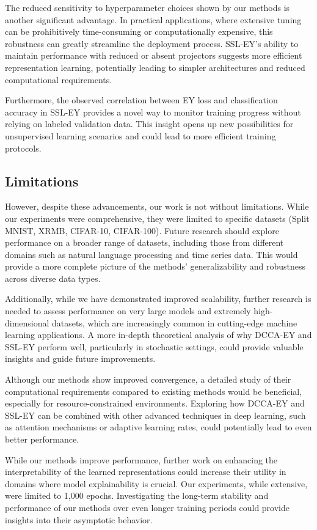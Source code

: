 The reduced sensitivity to hyperparameter choices shown by our methods is another significant advantage. In practical applications, where extensive tuning can be prohibitively time-consuming or computationally expensive, this robustness can greatly streamline the deployment process. SSL-EY's ability to maintain performance with reduced or absent projectors suggests more efficient representation learning, potentially leading to simpler architectures and reduced computational requirements.

Furthermore, the observed correlation between EY loss and classification accuracy in SSL-EY provides a novel way to monitor training progress without relying on labeled validation data. This insight opens up new possibilities for unsupervised learning scenarios and could lead to more efficient training protocols.

\subsection{Limitations}

However, despite these advancements, our work is not without limitations. While our experiments were comprehensive, they were limited to specific datasets (Split MNIST, XRMB, CIFAR-10, CIFAR-100). Future research should explore performance on a broader range of datasets, including those from different domains such as natural language processing and time series data. This would provide a more complete picture of the methods' generalizability and robustness across diverse data types.

Additionally, while we have demonstrated improved scalability, further research is needed to assess performance on very large models and extremely high-dimensional datasets, which are increasingly common in cutting-edge machine learning applications. A more in-depth theoretical analysis of why DCCA-EY and SSL-EY perform well, particularly in stochastic settings, could provide valuable insights and guide future improvements.

Although our methods show improved convergence, a detailed study of their computational requirements compared to existing methods would be beneficial, especially for resource-constrained environments. Exploring how DCCA-EY and SSL-EY can be combined with other advanced techniques in deep learning, such as attention mechanisms or adaptive learning rates, could potentially lead to even better performance.

While our methods improve performance, further work on enhancing the interpretability of the learned representations could increase their utility in domains where model explainability is crucial. Our experiments, while extensive, were limited to 1,000 epochs. Investigating the long-term stability and performance of our methods over even longer training periods could provide insights into their asymptotic behavior.

